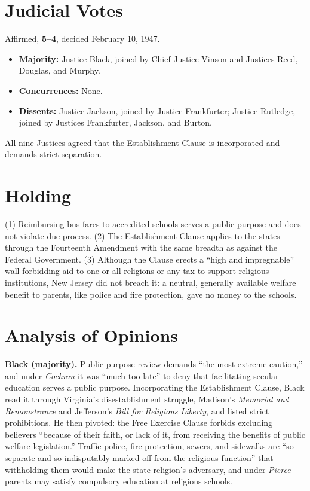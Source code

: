 \documentclass[12pt]{article}
\begin{document}
\section{Judicial Votes}

Affirmed, \textbf{5--4}, decided February 10, 1947.
\begin{itemize}
\item \textbf{Majority:} Justice Black, joined by Chief Justice Vinson and Justices Reed, Douglas, and Murphy.
\item \textbf{Concurrences:} None.
\item \textbf{Dissents:} Justice Jackson, joined by Justice Frankfurter; Justice Rutledge, joined by Justices Frankfurter, Jackson, and Burton.
\end{itemize}
All nine Justices agreed that the Establishment Clause is incorporated and demands strict separation.

\section{Holding}

(1) Reimbursing bus fares to accredited schools serves a public purpose and does not violate due process. (2) The Establishment Clause applies to the states through the Fourteenth Amendment with the same breadth as against the Federal Government. (3) Although the Clause erects a ``high and impregnable'' wall forbidding aid to one or all religions or any tax to support religious institutions, New Jersey did not breach it: a neutral, generally available welfare benefit to parents, like police and fire protection, gave no money to the schools.

\section{Analysis of Opinions}

\textbf{Black (majority).} Public-purpose review demands ``the most extreme caution,'' and under \textit{Cochran} it was ``much too late'' to deny that facilitating secular education serves a public purpose. Incorporating the Establishment Clause, Black read it through Virginia's disestablishment struggle, Madison's \emph{Memorial and Remonstrance} and Jefferson's \emph{Bill for Religious Liberty}, and listed strict prohibitions. He then pivoted: the Free Exercise Clause forbids excluding believers ``because of their faith, or lack of it, from receiving the benefits of public welfare legislation.'' Traffic police, fire protection, sewers, and sidewalks are ``so separate and so indisputably marked off from the religious function'' that withholding them would make the state religion's adversary, and under \textit{Pierce} parents may satisfy compulsory education at religious schools.
\end{document}
